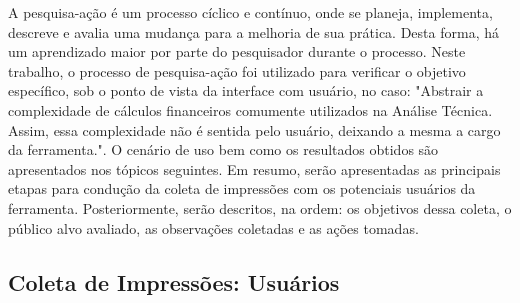 \newpage
A pesquisa-ação é um processo cíclico e contínuo, onde se planeja, implementa, descreve e avalia uma mudança para a melhoria de sua prática. Desta forma, há um aprendizado maior por parte do pesquisador durante o processo. Neste trabalho, o processo de pesquisa-ação foi utilizado para verificar o objetivo específico, sob o ponto de vista da interface com usuário, no caso: "Abstrair a complexidade de cálculos financeiros comumente utilizados na Análise Técnica. Assim, essa complexidade não é sentida pelo usuário, deixando a mesma a cargo da ferramenta.". O cenário de uso bem como os resultados obtidos são apresentados nos tópicos seguintes. Em resumo, serão apresentadas as principais etapas para condução da coleta de impressões com os potenciais usuários da ferramenta. Posteriormente, serão descritos, na ordem: os objetivos dessa coleta, o público alvo avaliado, as observações coletadas e as ações tomadas.

\subsection{Coleta de Impressões: Usuários}




